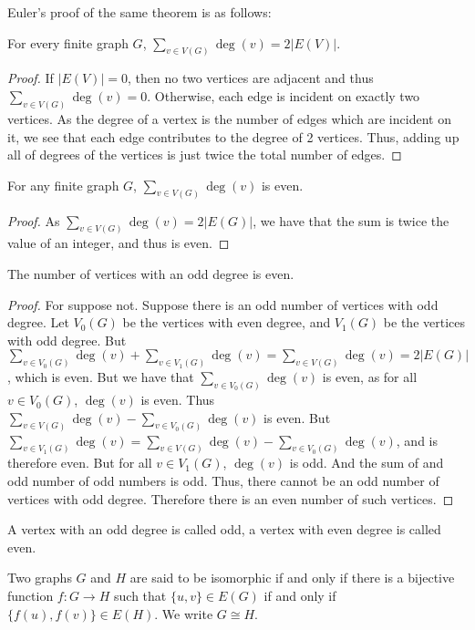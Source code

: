         Euler's proof of the same theorem is as follows:
        \begin{theorem}
            For every finite graph $G$, $\sum_{v\in{V}(G)}\deg(v)=2|E(V)|$.
        \end{theorem}
        \begin{proof}
            If $|E(V)|=0$, then no two vertices are adjacent and thus
            $\sum_{v\in V(G)}\deg(v)=0$. Otherwise, each edge is incident on
            exactly two vertices. As the degree of a vertex is the number of edges which are incident on it, we see that each edge contributes to the degree of 2 vertices. Thus, adding up all of degrees of the vertices is just twice the total number of edges.
        \end{proof}
        \begin{theorem}
        For any finite graph $G$, $\sum_{v\in V(G)}\deg(v)$ is even.
        \end{theorem}
        \begin{proof} As $\sum_{v\in V(G)}\deg(v) = 2|E(G)|$, we have that the sum is twice the value of an integer, and thus is even.
        \end{proof}
        \begin{theorem}
        The number of vertices with an odd degree is even.
        \end{theorem}
        \begin{proof}
        For suppose not. Suppose there is an odd number of vertices with odd degree. Let $V_0(G)$ be the vertices with even degree, and $V_1(G)$ be the vertices with odd degree. But $\sum_{v\in V_0(G)}\deg(v) + \sum_{v\in V_1(G)} \deg(v) = \sum_{v\in V(G)}\deg(v) = 2|E(G)|$, which is even. But we have that $\sum_{v\in V_0(G)}\deg(v)$ is even, as for all $v\in V_{0}(G)$, $\deg(v)$ is even. Thus $\sum_{v\in V(G)}\deg(v) - \sum_{v\in V_0(G)}\deg(v)$ is even. But $\sum_{v\in V_1(G)}\deg(v) = \sum_{v\in V(G)}\deg(v) - \sum_{v\in V_0(G)}\deg(v)$, and is therefore even. But for all $v\in V_1(G)$, $\deg(v)$ is odd. And the sum of and odd number of odd numbers is odd. Thus, there cannot be an odd number of vertices with odd degree. Therefore there is an even number of such vertices.
        \end{proof}
        \begin{definition}
        A vertex with an odd degree is called odd, a vertex with even degree is called even.
        \end{definition}
        \begin{definition}
        Two graphs $G$ and $H$ are said to be isomorphic if and only if there is a bijective function $f:G\rightarrow H$ such that $\{u,v\}\in E(G)$ if and only if $\{f(u),f(v)\}\in E(H)$. We write $G \cong H$.
        \end{definition}
